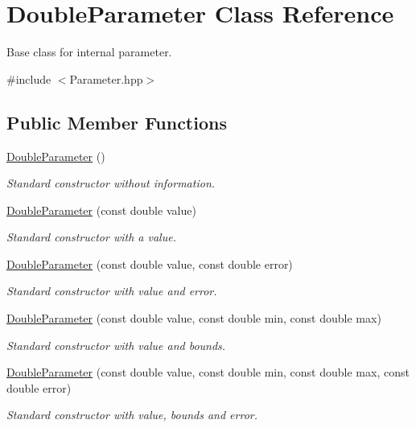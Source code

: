 \hypertarget{class_double_parameter}{\section{Double\-Parameter Class Reference}
\label{class_double_parameter}
}


Base class for internal parameter.  




{\ttfamily \#include $<$Parameter.\-hpp$>$}

\subsection*{Public Member Functions}
\begin{DoxyCompactItemize}
\item 
\hyperlink{class_double_parameter_a788fc09da198074693fcf482f6fefef8}{Double\-Parameter} ()
\begin{DoxyCompactList}\small\item\em Standard constructor without information. \end{DoxyCompactList}\item 
\hyperlink{class_double_parameter_aefd633ed3d4a3b2c7a60d6d8667482f3}{Double\-Parameter} (const double value)
\begin{DoxyCompactList}\small\item\em Standard constructor with a value. \end{DoxyCompactList}\item 
\hyperlink{class_double_parameter_a3d7a01dded09610ef00b84fb76d9ceda}{Double\-Parameter} (const double value, const double error)
\begin{DoxyCompactList}\small\item\em Standard constructor with value and error. \end{DoxyCompactList}\item 
\hyperlink{class_double_parameter_a1b09f07ebff40abf6c3570a2a022bb4f}{Double\-Parameter} (const double value, const double min, const double max)
\begin{DoxyCompactList}\small\item\em Standard constructor with value and bounds. \end{DoxyCompactList}\item 
\hyperlink{class_double_parameter_a9ac48d2b079e8badfeb2dc1a25fab078}{Double\-Parameter} (const double value, const double min, const double max, const double error)
\begin{DoxyCompactList}\small\item\em Standard constructor with value, bounds and error. \end{DoxyCompactList}\item 

\end{DoxyCompactItemize}
